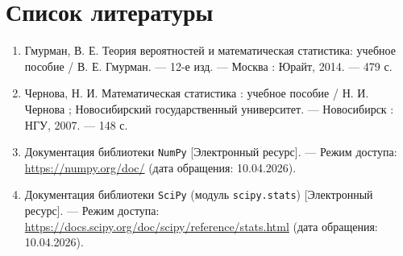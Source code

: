 \section*{Список литературы}

\begin{enumerate}
    \item Гмурман, В. Е. Теория вероятностей и математическая статистика: 
    учебное пособие / В. Е. Гмурман. — 12-е изд. — Москва : Юрайт, 2014. — 479 с.
    \item Чернова, Н. И. Математическая статистика : учебное пособие / Н. И. Чернова ;
    Новосибирский государственный университет. — Новосибирск : НГУ, 2007. — 148 с.
    \item Документация библиотеки \texttt{NumPy} [Электронный ресурс]. — Режим доступа:
    \url{https://numpy.org/doc/} (дата обращения: 10.04.2026).
    \item Документация библиотеки \texttt{SciPy} (модуль \texttt{scipy.stats})
    [Электронный ресурс]. — Режим доступа: \url{https://docs.scipy.org/doc/scipy/reference/stats.html} (дата обращения: 10.04.2026).
\end{enumerate}